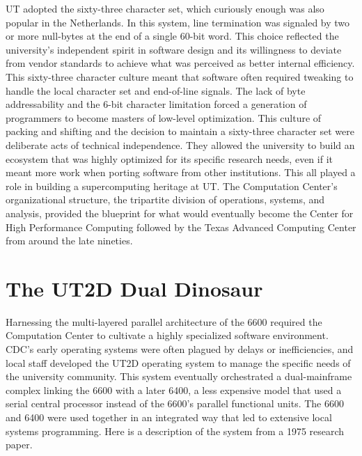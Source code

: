 UT adopted the sixty-three character set, which curiously enough was also popular in the Netherlands. In this system, line termination was signaled by two or more null-bytes at the end of a single 60-bit word. This choice reflected the university's independent spirit in software design and its willingness to deviate from vendor standards to achieve what was perceived as better internal efficiency. This sixty-three character culture meant that software often required tweaking to handle the local character set and end-of-line signals. The lack of byte addressability and the 6-bit character limitation forced a generation of programmers to become masters of low-level optimization. This culture of packing and shifting and the decision to maintain a sixty-three character set were deliberate acts of technical independence. They allowed the university to build an ecosystem that was highly optimized for its specific research needs, even if it meant more work when porting software from other institutions. This all played a role in building a supercomputing heritage at UT. The Computation Center's organizational structure, the tripartite division of operations, systems, and analysis, provided the blueprint for what would eventually become the Center for High Performance Computing followed by the Texas Advanced Computing Center from around the late nineties.

\section{The UT2D Dual Dinosaur}

Harnessing the multi-layered parallel architecture of the 6600 required the Computation Center to cultivate a highly specialized software environment. CDC’s early operating systems were often plagued by delays or inefficiencies, and local staff developed the UT2D operating system to manage the specific needs of the university community. This system eventually orchestrated a dual-mainframe complex linking the 6600 with a later 6400, a less expensive model that used a serial central processor instead of the 6600's parallel functional units. The 6600 and 6400 were used together in an integrated way that led to extensive local systems programming. Here is a description of the system from a 1975 research paper.

